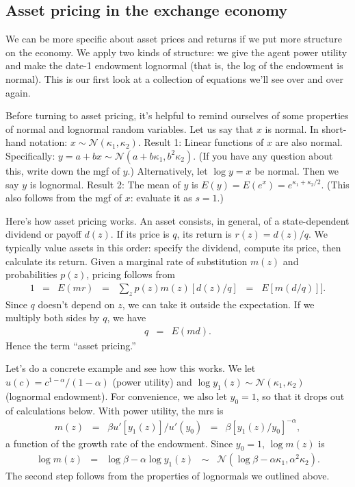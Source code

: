 \documentclass[11pt]{article}
\begin{document}
\subsection*{Asset pricing in the exchange economy}

We can be more specific about asset prices and returns
if we put more structure on the economy.
We apply two kinds of structure:  we give the agent power utility
and make the date-1 endowment lognormal (that is, the log of the
endowment is normal).
This is our first look at a collection of equations we'll
see over and over again.

Before turning to asset pricing, it's helpful to remind ourselves
of some properties of normal and lognormal random variables.
Let us say that $x$ is normal.
In short-hand notation:  $ x \sim \mathcal{N}(\kappa_1,\kappa_2)$.
Result 1:  Linear functions of $x$ are also normal.
Specifically:  $ y = a + b x \sim \mathcal{N}(a + b \kappa_1, b^2 \kappa_2)$.
(If you have any question about this, write down the mgf of $y$.)
Alternatively, let $\log y = x$ be normal.
Then we say $y$ is lognormal.
Result 2:  The mean of $y$ is $E(y) = E(e^x) = e^{\kappa_1 + \kappa_2/2}$.
(This also follows from the mgf of $x$:  evaluate it as $s=1$.)

Here's how asset pricing works.
An asset consists, in general,
of a state-dependent dividend or payoff $d(z)$.
If its price is $q$, its return is $ r(z) = d(z)/q$.
We typically value assets in this order:
specify the dividend, compute its price, then calculate its return.
Given a marginal rate of substitution $m(z)$ and probabilities $p(z)$,
pricing follows from
\begin{eqnarray*}
    1 &=& E (mr) \;\;=\;\; \sum_z p(z) m(z) [d(z)/q] \;\;=\;\;  E [m (d/q)]] .
\end{eqnarray*}
Since $q$ doesn't depend on $z$, we can take it outside the expectation.
If we multiply both sides by $q$, we have
\begin{eqnarray*}
    q &=& E (md)  .
\end{eqnarray*}
Hence the term ``asset pricing.''


Let's do a concrete example and see how this works.
We let $u(c) = c^{1-\alpha}/(1-\alpha)$ (power utility)
and
$\log y_1(z) \sim \mathcal{N}(\kappa_1,\kappa_2)$
(lognormal endowment).
For convenience, we also let $y_0 = 1$, so that it drops out of
calculations below.
With power utility, the mrs is
\begin{eqnarray*}
        m(z) \;\;=\;\; {\beta u'[y_1(z)]}/{u'(y_0)} &=&  \beta [y_1(z)/y_0]^{-\alpha} ,
\end{eqnarray*}
a function of the growth rate of the endowment.
Since $y_0 = 1$, $\log m(z)$ is
\begin{eqnarray*}
    \log m(z) &=& \log \beta - \alpha \log y_1(z)
        \;\;\sim\;\; \mathcal{N}(\log \beta - \alpha \kappa_1, \alpha^2 \kappa_2).
\end{eqnarray*}
The second step follows from the properties of lognormals we outlined above.
\end{document}

